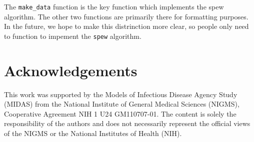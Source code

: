 \documentclass{article}
\begin{document}
The \verb|make_data| function is the key function which implements the spew algorithm. The other two functions are primarily there for formatting purposes. In the future, we hope to make this distrinction more clear, so people only need to function to impement the \verb|spew| algorithm. 

\newpage 
\section{Acknowledgements}
This work was supported by the Models of Infectious Disease Agency Study (MIDAS) from the National Institute of General Medical Sciences (NIGMS), Cooperative Agreement NIH 1 U24 GM110707-01. The content is solely the responsibility of the authors and does not necessarily represent the official views of the NIGMS or the National Institutes of Health (NIH).
\end{document}
